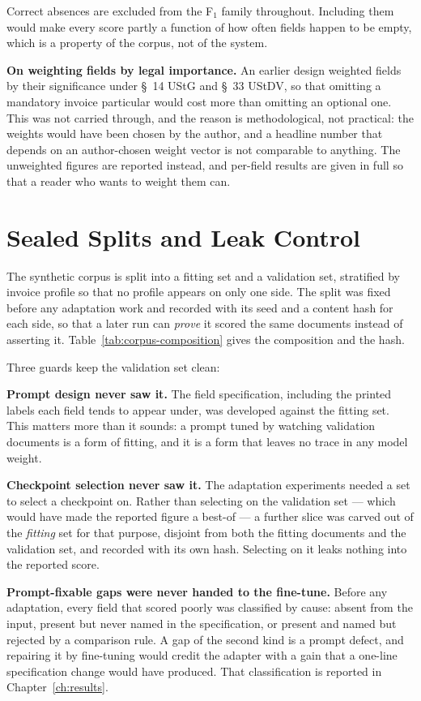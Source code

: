 Correct absences are excluded from the F$_1$ family throughout. Including them would make
every score partly a function of how often fields happen to be empty, which is a property of
the corpus, not of the system.

\textbf{On weighting fields by legal importance.} An earlier design weighted fields by their
significance under \S~14 \ac{UStG} and \S~33 \ac{UStDV}, so that omitting a mandatory invoice
particular would cost more than omitting an optional one. This was not carried through, and
the reason is methodological, not practical: the weights would have been chosen by the
author, and a headline number that depends on an author-chosen weight vector is not
comparable to anything. The unweighted figures are reported instead, and per-field results are
given in full so that a reader who wants to weight them can.

\section{Sealed Splits and Leak Control}
\label{sec:method-splits}

The synthetic corpus is split into a fitting set and a validation set, stratified by invoice
profile so that no profile appears on only one side. The split was fixed before any adaptation
work and recorded with its seed and a content hash for each side, so that a later run can
\emph{prove} it scored the same documents instead of asserting it. Table~\ref{tab:corpus-composition}
gives the composition and the hash.

Three guards keep the validation set clean:

\textbf{Prompt design never saw it.} The field specification, including the printed labels
each field tends to appear under, was developed against the fitting set. This matters more
than it sounds: a prompt tuned by watching validation documents is a form of fitting, and it
is a form that leaves no trace in any model weight.

\textbf{Checkpoint selection never saw it.} The adaptation experiments needed a set to select
a checkpoint on. Rather than selecting on the validation set --- which would have made the
reported figure a best-of --- a further slice was carved out of the \emph{fitting} set for
that purpose, disjoint from both the fitting documents and the validation set, and recorded
with its own hash. Selecting on it leaks nothing into the reported score.

\textbf{Prompt-fixable gaps were never handed to the fine-tune.} Before any adaptation, every
field that scored poorly was classified by cause: absent from the input, present but never
named in the specification, or present and named but rejected by a comparison rule. A gap of
the second kind is a prompt defect, and repairing it by fine-tuning would credit the adapter
with a gain that a one-line specification change would have produced. That classification is
reported in Chapter~\ref{ch:results}.


